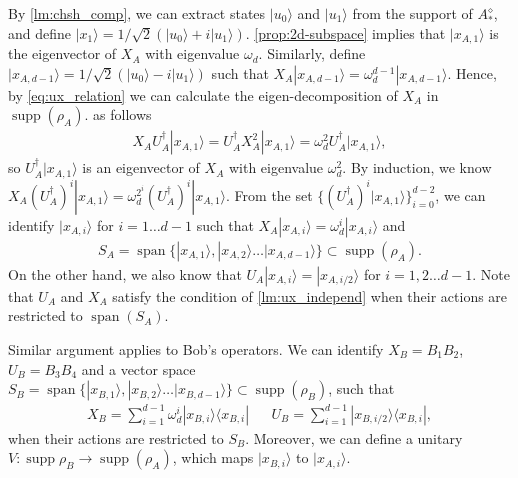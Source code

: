 \documentclass[11pt,letterpaper]{article}
\newcommand{\ket}[1]{|#1\rangle}
\newcommand{\ketbra}[2]{|#1\rangle\langle#2|}
\DeclareMathOperator{\spn}{span}
\DeclareMathOperator{\supp}{supp}
\newcommand{\1}{\mathbb{1}}
\theoremstyle{definition}
\begin{document}
By \cref{lm:chsh_comp}, we can extract states $\ket{u_0}$ and $\ket{u_1}$ from the support of $A_\ast^\diamond$,   
and define $\ket{x_1} = 1/\sqrt{2}(\ket{u_0} + i\ket{u_1})$. 
\cref{prop:2d-subspace} implies that $\ket{x_{A,1}}$ is the eigenvector of $X_A$ with eigenvalue $\omega_d$.
Similarly, define $\ket{x_{A,d-1}} = 1/\sqrt{2}(\ket{u_0} - i\ket{u_1})$ such that $X_A \ket{x_{A,d-1}} = \omega_d^{d-1}\ket{x_{A,d-1}}$.
Hence, by \cref{eq:ux_relation} we can calculate the eigen-decomposition of $X_A$ in $\supp(\rho_A)$.
as follows
\begin{align}
\label{eq:ladder}
 X_AU_A^\dagger \ket{x_{A,1}} = U_A^\dagger X_A^2 \ket{x_{A,1}} = \omega_d^2 U_A^\dagger \ket{x_{A,1}},
\end{align}
so $U_A^\dagger \ket{x_{A,1}}$ is an eigenvector of $X_A$ with eigenvalue $\omega_d^2$.
By induction, we know $X_A (U_A^\dagger)^i \ket{x_{A,1}} = \omega_d^{2^i} (U_A^\dagger)^i\ket{x_{A,1}}$. 
From the set $\{(U_A^\dagger)^i \ket{x_{A,1}}\}_{i=0}^{d-2}$, we can identify $\ket{x_{A,i}}$ for $i = 1 \dots  d-1$
such that $X_A \ket{x_{A,i}} = \omega_d^i \ket{x_{A,i}}$ and 
\begin{align}
S_A = \spn \{ \ket{x_{A,1}}, \ket{x_{A,2}} \dots  \ket{x_{A,d-1}} \} \subset \supp(\rho_A).
\end{align}
On the other hand, we also know that $U_A \ket{x_{A,i}} = \ket{x_{A,i/2}}$ for $i = 1,2 \dots d-1$.
Note that $U_A$ and $X_A$ satisfy the condition of \cref{lm:ux_independ} when their actions are 
restricted to $\spn(S_A)$.

Similar argument applies to Bob's operators. We can identify $X_B = B_1B_2$, 
$U_B=B_3B_4$ and a vector space $S_B =\spn\{ \ket{x_{B,1}}, \ket{x_{B,2}} \dots  \ket{x_{B,d-1}} \} \subset \supp(\rho_B)$,
such that 
\begin{align}
	X_B = \sum_{i=1}^{d-1} \omega_d^i \ketbra{x_{B,i}}{x_{B,i}} && U_B = \sum_{i=1}^{d-1} \ketbra{x_{B,i/2}}{x_{B,i}},
\end{align}
when their actions are restricted to $S_B$. Moreover, we can define a unitary $V: \supp{\rho_B} \to \supp(\rho_A)$,
which maps $\ket{x_{B,i}}$ to $\ket{x_{A,i}}$.
\end{document}
